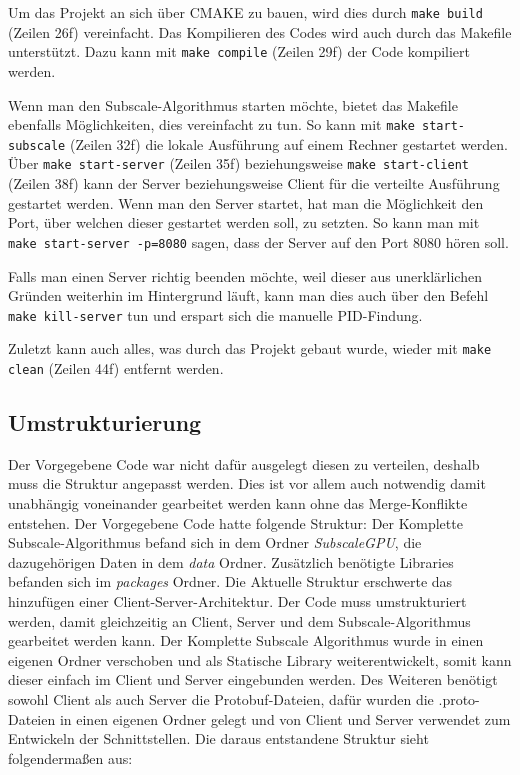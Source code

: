 Um das Projekt an sich über CMAKE zu bauen, wird dies durch \verb|make build| (Zeilen 26f) vereinfacht. Das Kompilieren des Codes wird auch durch das Makefile unterstützt. Dazu kann mit \verb|make compile| (Zeilen 29f) der Code kompiliert werden.

Wenn man den Subscale-Algorithmus starten möchte, bietet das Makefile ebenfalls Möglichkeiten, dies vereinfacht zu tun. So kann mit \verb|make start-subscale| (Zeilen 32f) die lokale Ausführung auf einem Rechner gestartet werden. Über \verb|make start-server| (Zeilen 35f) beziehungsweise \verb|make start-client| (Zeilen 38f) kann der Server beziehungsweise Client für die verteilte Ausführung gestartet werden. Wenn man den Server startet, hat man die Möglichkeit den Port, über welchen dieser gestartet werden soll, zu setzten. So kann man mit \verb|make start-server -p=8080| sagen, dass der Server auf den Port 8080 hören soll.

Falls man einen Server richtig beenden möchte, weil dieser aus unerklärlichen Gründen weiterhin im Hintergrund läuft, kann man dies auch über den Befehl \verb|make kill-server| tun und erspart sich die manuelle PID-Findung.

Zuletzt kann auch alles, was durch das Projekt gebaut wurde, wieder mit \verb|make clean| (Zeilen 44f) entfernt werden.

\subsection{Umstrukturierung}
Der Vorgegebene Code war nicht dafür ausgelegt diesen zu verteilen, deshalb muss die Struktur angepasst werden. Dies ist vor allem auch notwendig damit unabhängig voneinander gearbeitet werden kann ohne das Merge-Konflikte entstehen. Der Vorgegebene Code hatte folgende Struktur:
Der Komplette Subscale-Algorithmus befand sich in dem Ordner \textit{SubscaleGPU}, die dazugehörigen Daten in dem \textit{data} Ordner. Zusätzlich benötigte Libraries befanden sich im \textit{packages} Ordner. Die Aktuelle Struktur erschwerte das hinzufügen einer Client-Server-Architektur. Der Code muss umstrukturiert werden, damit gleichzeitig an Client, Server und dem Subscale-Algorithmus gearbeitet werden kann. Der Komplette Subscale Algorithmus wurde in einen eigenen Ordner verschoben und als Statische Library weiterentwickelt, somit kann dieser einfach im Client und Server eingebunden werden. Des Weiteren benötigt sowohl Client als auch Server die Protobuf-Dateien, dafür wurden die .proto-Dateien in einen eigenen Ordner gelegt und von Client und Server verwendet zum Entwickeln der Schnittstellen. Die daraus entstandene Struktur sieht folgendermaßen aus:

